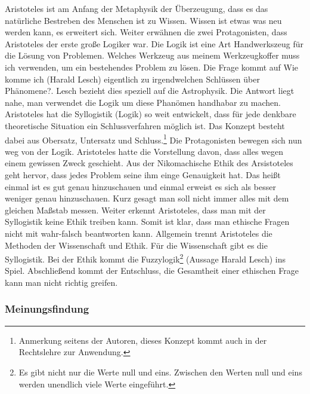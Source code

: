 Aristoteles ist am Anfang der Metaphysik der Überzeugung, dass es das natürliche Bestreben des Menschen ist zu Wissen. Wissen ist etwas was neu werden kann, es erweitert sich. Weiter erwähnen die zwei Protagonisten, dass Aristoteles der erste große Logiker war. Die Logik ist eine Art Handwerkszeug für die Lösung von Problemen. Welches Werkzeug aus meinem Werkzeugkoffer muss ich verwenden, um ein bestehendes Problem zu lösen. Die Frage kommt auf \glqq Wie komme ich (Harald Lesch) eigentlich zu irgendwelchen Schlüssen über Phänomene?\grqq. Lesch bezieht dies speziell auf die Astrophysik. Die Antwort liegt nahe, man verwendet die Logik um diese Phanömen handhabar zu machen. Aristoteles hat die Syllogistik (Logik) so weit entwickelt, dass für jede denkbare theoretische Situation ein Schlussverfahren möglich ist. Das Konzept besteht dabei aus Obersatz, Untersatz und Schluss.\footnote{Anmerkung seitens der Autoren, dieses Konzept kommt auch in der Rechtslehre zur Anwendung.} Die Protagonisten bewegen sich nun weg von der Logik. Aristoteles hatte die Vorstellung davon, dass alles wegen einem gewissen Zweck geschieht. Aus der Nikomachische Ethik des Arsistoteles geht hervor, dass jedes Problem seine ihm einge Genauigkeit hat. Das heißt einmal ist es gut genau hinzuschauen und einmal erweist es sich als besser weniger genau hinzuschauen. Kurz gesagt man soll nicht immer alles mit dem gleichen Maßstab messen. Weiter erkennt Aristoteles, dass man mit der Syllogistik keine Ethik treiben kann. Somit ist klar, dass man ethische Fragen nicht mit wahr-falsch beantworten kann. Allgemein trennt Aristoteles die Methoden der Wissenschaft und Ethik. Für die Wissenschaft gibt es die Syllogistik. Bei der Ethik kommt die Fuzzylogik\footnote{Es gibt nicht nur die Werte null und eins. Zwischen  den Werten null und eins werden unendlich viele Werte eingeführt.} (Aussage Harald Lesch) ins Spiel. Abschließend kommt der Entschluss, die Gesamtheit einer ethischen Frage kann man nicht richtig greifen. 

\subsubsection{Meinungsfindung}

